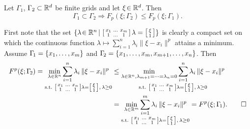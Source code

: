 \begin{prop}\label{prop:PtsInsertion} Let $\Gamma_1$, $\Gamma_2 \subset \mathbb{R}^d$
be finite grids and let $\xi\!\in \mathbb{R}^d$. Then
\[
\Gamma_1 \subset \Gamma_2 \Longrightarrow F_p(\xi; \Gamma_2) \leq F_p(\xi;
\Gamma_1).
\]
\end{prop}
 First note that the set $\{\lambda\!\in \mathbb{R}^n\,|\,  \left[  \begin{smallmatrix}
          x_1 & \ldots & x_m\\
          1 & \ldots & 1\\
        \end{smallmatrix}  \right] \lambda =
      \left[\begin{smallmatrix}
         \xi\\ 1\\
        \end{smallmatrix} \right]\}$ 
        is clearly a compact set on which the continuous function 
        $\lambda
        \mapsto \sum_{i=1}^n \lambda_i \|\xi-x_i\|^p$ attains a minimum.
Assume $\Gamma_{\!1} = \{x_1, \ldots, x_m\}$ and $\Gamma_{\!2} = \{x_1, \ldots, x_m,
x_{m+1}, \ldots, x_n\}$. Then
\begin{eqnarray*}
\begin{split}
  F^p(\xi; \Gamma_{\!2})  = \underset{\text{s.t. } \left[ \begin{smallmatrix} x_1 & \ldots & x_n\\ 1 & \ldots & 1\\ \end{smallmatrix} \right] \lambda = \left[\begin{smallmatrix} \xi\\ 1\\ \end{smallmatrix} \right],\, \lambda \geq 0}{\min_{\lambda\in\mathbb{R}^n}\sum_{i=1}^n \lambda_i \, \lVert\xi-x_i\rVert^p} 
  & \leq
  \underset{ \text{s.t. } \left[  \begin{smallmatrix}
          x_1 & \ldots & x_m\\
          1 & \ldots & 1\\
        \end{smallmatrix}  \right] \lambda =
      \left[\begin{smallmatrix}
         \xi\\ 1\\
        \end{smallmatrix} \right],\,
      \lambda \geq 0 }{\min_{\lambda \in \mathbb{R}^n, \lambda_{m+1}=\cdots= \lambda_n = 0}\sum_{i=1}^n \lambda_i
      \, \lVert\xi-x_i\rVert^p}\\
  & = \underset{ \text{s.t. } \left[  \begin{smallmatrix}
          x_1 & \ldots & x_m\\
          1 & \ldots & 1\\
        \end{smallmatrix}  \right] \lambda =
      \left[\begin{smallmatrix}
         \xi\\ 1\\
        \end{smallmatrix} \right],\,
      \lambda \geq 0 }{\min_{\lambda\in \mathbb{R}^m }\sum_{i=1}^m \lambda_i
      \, \lVert\xi-x_i\rVert^p}
   = F^p(\xi; \Gamma_{\!1}).\qquad \Box
\end{split}
\end{eqnarray*}


